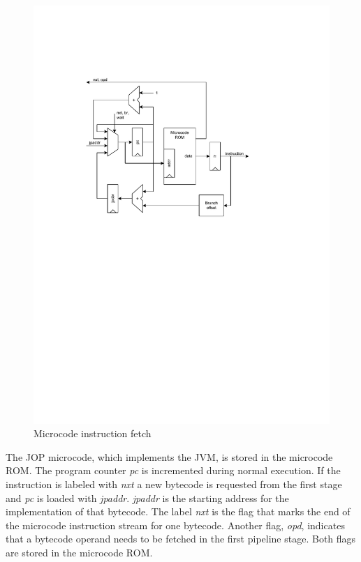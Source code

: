 \begin{figure}[t]
    \centering
    \includegraphics[scale=\picscale]{arch/arch_fetch}
    \caption{Microcode instruction fetch}
    \label{fig_arch_fetch}
\end{figure}

The JOP microcode, which implements the JVM, is stored in the
microcode ROM. The program counter \emph{pc} is incremented during
normal execution. If the instruction is labeled with \emph{nxt} a new
bytecode is requested from the first stage and \emph{pc} is loaded
with \emph{jpaddr}. \emph{jpaddr} is the starting address for the
implementation of that bytecode. The label \emph{nxt} is the flag
that marks the end of the microcode instruction stream for one
bytecode. Another flag, \emph{opd}, indicates that a bytecode operand
needs to be fetched in the first pipeline stage. Both flags are
stored in the microcode ROM.

